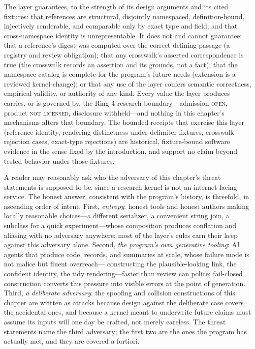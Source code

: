 \begin{boundary}\label{ch03:bd-limits}
The layer guarantees, to the strength of its design arguments and
its cited fixtures: that references are structural, disjointly
namespaced, definition-bound, injectively renderable, and
comparable only by exact type and field; and that cross-namespace
identity is unrepresentable. It does not and cannot guarantee:
that a reference's digest was computed over the correct defining
passage (a registry and review obligation); that any crosswalk's
asserted correspondence is true (the crosswalk records an
assertion and its grounds, not a fact); that the namespace catalog
is complete for the program's future needs (extension is a
reviewed kernel change); or that any use of the layer confers
semantic correctness, empirical validity, or authority of any
kind. Every value the layer produces carries, or is governed by,
the Ring-4 research boundary---admission \textsc{open}, product
\textsc{not licensed}, disclosure withheld---and nothing in this
chapter's mechanisms alters that boundary. The bounded receipts
that exercise this layer (reference identity, rendering
distinctness under delimiter fixtures, crosswalk rejection cases,
exact-type rejections) are historical, fixture-bound software
evidence in the sense fixed by the introduction, and support no
claim beyond tested behavior under those fixtures.
\end{boundary}

\begin{remark}\label{ch03:remark-adversary}
A reader may reasonably ask who the adversary of this chapter's
threat statements is supposed to be, since a research kernel is
not an internet-facing service. The honest answer, consistent
with the program's history, is threefold, in ascending order of
intent. First, \emph{entropy}: honest tools and honest authors
making locally reasonable choices---a different serializer, a
convenient string join, a subclass for a quick experiment---whose
composition produces conflation and aliasing with no adversary
anywhere; most of the layer's rules earn their keep against this
adversary alone. Second, \emph{the program's own generative
tooling}: AI agents that produce code, records, and summaries at
scale, whose failure mode is not malice but fluent overreach---
constructing the plausible-looking link, the confident identity,
the tidy rendering---faster than review can police; fail-closed
construction converts this pressure into visible errors at the
point of generation. Third, \emph{a deliberate adversary}: the
spoofing and collision constructions of this chapter are written
as attacks because design against the deliberate case covers the
accidental ones, and because a kernel meant to underwrite future
claims must assume its inputs will one day be crafted, not merely
careless. The threat statements name the third adversary; the
first two are the ones the program has actually met, and they are
covered a fortiori.
\end{remark}

